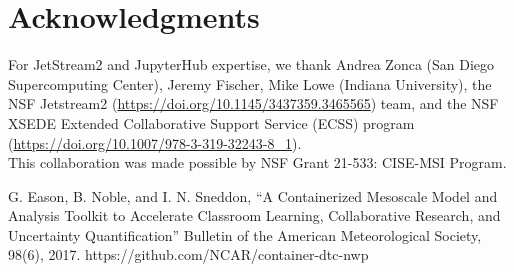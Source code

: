 \documentclass[conference]{IEEEtran}
\begin{document}
\section*{Acknowledgments}

For JetStream2 and JupyterHub expertise, we thank Andrea Zonca (San Diego
Supercomputing Center), Jeremy Fischer, Mike Lowe (Indiana University), the NSF
Jetstream2 (\url{https://doi.org/10.1145/3437359.3465565}) team, and the NSF XSEDE
Extended Collaborative Support Service (ECSS) program
(\url{https://doi.org/10.1007/978-3-319-32243-8_1}).
\\

This collaboration was made possible by NSF Grant 21-533: CISE-MSI Program.

\begin{thebibliography}{00}
 G. Eason, B. Noble, and I. N. Sneddon, ``A Containerized
    Mesoscale Model and Analysis Toolkit to Accelerate Classroom Learning,
    Collaborative Research, and Uncertainty Quantification'' Bulletin of the
    American Meteorological Society, 98(6), 2017.
 https://github.com/NCAR/container-dtc-nwp
\end{thebibliography}
\end{document}

